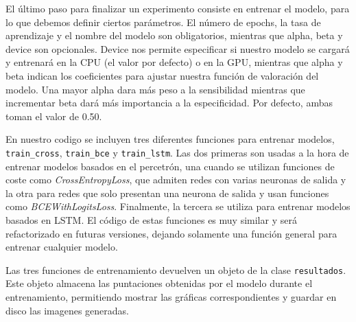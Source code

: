 
El último paso para finalizar un experimento consiste en entrenar el modelo, para lo que debemos definir ciertos parámetros. El número de epochs, la tasa de aprendizaje y el nombre del modelo son obligatorios, mientras que alpha, beta y device son opcionales. Device nos permite especificar si nuestro modelo se cargará y entrenará en la CPU (el valor por defecto) o en la GPU, mientras que alpha y beta indican los coeficientes para ajustar nuestra función de valoración del modelo. Una mayor alpha dara más peso a la sensibilidad mientras que incrementar beta dará más importancia a la especificidad. Por defecto, ambas toman el valor de 0.50.


En nuestro codigo se incluyen tres diferentes funciones para entrenar modelos, \texttt{train\_cross}, \texttt{train\_bce} y \texttt{train\_lstm}. Las dos primeras son usadas a la hora de entrenar modelos basados en el percetrón, una cuando se utilizan funciones de coste como \textit{CrossEntropyLoss}, que admiten redes con varias neuronas de salida y la otra para redes que solo presentan una neurona de salida y usan funciones como \textit{BCEWithLogitsLoss}. Finalmente, la tercera se utiliza para entrenar modelos basados en LSTM. El código de estas funciones es muy similar y será refactorizado en futuras versiones, dejando solamente una función general para entrenar cualquier modelo.

Las tres funciones de entrenamiento devuelven un objeto de la clase \texttt{resultados}. Este objeto almacena las puntaciones obtenidas por el modelo durante el entrenamiento, permitiendo mostrar las gráficas correspondientes y guardar en disco las imagenes generadas.

